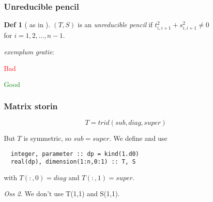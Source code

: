 \documentclass{beamer}
\theoremstyle{definition} \newtheorem{de}{Def}
\theoremstyle{remark} \newtheorem{os}[de]{Oss}
\theoremstyle{plain} \newtheorem{te}[de]{Teo}
\theoremstyle{plain} \newtheorem{co}[de]{Cor}
\theoremstyle{plain} \newtheorem{pr}[de]{Prop}
\theoremstyle{plain} \newtheorem{lem}[de]{Lemm}
\theoremstyle{remark} \newtheorem{rem}[de]{Remark}
\begin{document}
\begin{frame}
\frametitle{Unreducible pencil}

\begin{de}[ as in \cite{MR739278} ]
  $(T,S)$ is an \emph{unreducible pencil} if $t_{i,i+1}^2 + 
s_{i,i+1}^2 \neq 0$\\
  for $i=1,2,\dots,n-1$.
\end{de}

\pause

\emph{exemplum gratie}:

\begin{Bdescription}
  \item [\textcolor{red}{Bad}]
  
  \item [\textcolor{green}{Good}]
\end{Bdescription}

\end{frame}

\begin{frame}[fragile]
\frametitle{Matrix storin}

\begin{equation*}
  T = trid(sub,diag,super)
\end{equation*}

But $T$ is symmetric, so $sub=super$. We define and use

\begin{lstlisting}
  integer, parameter :: dp = kind(1.d0)
  real(dp), dimension(1:n,0:1) :: T, S  
\end{lstlisting}

with $T(:,0)=diag$ and $T(:,1)=super$.

\begin{os}
  We don't use T(1,1) and S(1,1). 
\end{os}

\end{frame}
\end{document}
